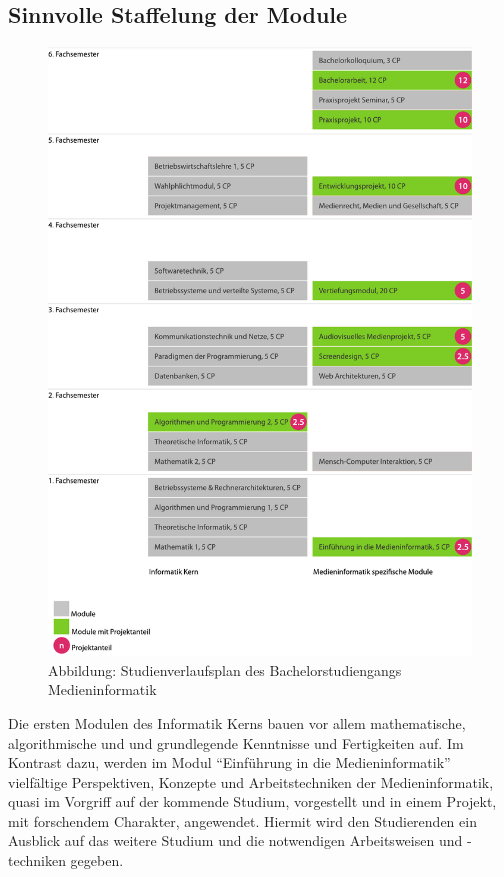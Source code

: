 \subsection{Sinnvolle Staffelung der
Module}\label{sinnvolle-staffelung-der-module}

\begin{figure}[htbp]
\centering
\includegraphics[width=\columnwidth]{../anhaenge/bilder/ba-verlaufsplan.pdf}
\caption{Abbildung: Studienverlaufsplan des Bachelorstudiengangs
Medieninformatik}
\end{figure}

Die ersten Modulen des Informatik Kerns bauen vor allem mathematische,
algorithmische und und grundlegende Kenntnisse und Fertigkeiten auf. Im
Kontrast dazu, werden im Modul ``Einführung in die Medieninformatik''
vielfältige Perspektiven, Konzepte und Arbeitstechniken der
Medieninformatik, quasi im Vorgriff auf der kommende Studium,
vorgestellt und in einem Projekt, mit forschendem Charakter, angewendet.
Hiermit wird den Studierenden ein Ausblick auf das weitere Studium und
die notwendigen Arbeitsweisen und -techniken gegeben.

